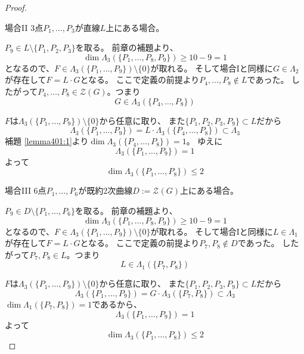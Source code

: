 \documentclass[a4paper]{jsarticle}
\begin{document}
\begin{proof}
            \begin{itembox}[l]{場合II}
                3点$P_1, \dots, P_3$が直線$L$上にある場合。
            \end{itembox}
            $P_9 \in L \setminus \{P_1, P_2, P_3\}$を取る。
            前章の補題より、
            \[ \dim \Lambda_3(\{P_1, \dots, P_8, P_9 \}) \geq 10-9=1 \]
            となるので、$F \in \Lambda_3(\{P_1, \dots, P_9 \}) \setminus \{0\}$が取れる。
            そして場合Iと同様に$G \in \Lambda_2$が存在して$F=L \cdot G$となる。
            ここで定義の前提より$P_4, \dots, P_8 \not \in L$であった。
            したがって$P_4, \dots, P_8 \in \mathcal{Z}(G)$。つまり
            \[ G \in \Lambda_3(\{P_4, \dots, P_8 \}) \]

            $F$は$\Lambda_3(\{P_1, \dots, P_9 \}) \setminus \{0\}$から任意に取り、
            また$\{P_1, P_2, P_3, P_9\} \subset L$だから
            \[ \Lambda_3(\{P_1, \dots, P_9 \})=L \cdot \Lambda_3(\{P_4, \dots, P_8 \}) \subset \Lambda_3 \]
            補題 \ref{lemma401:1}より$\dim \Lambda_3(\{P_4, \dots, P_8 \})=1$。
            ゆえに
            \[ \Lambda_3(\{P_1, \dots, P_9 \})=1 \]
            よって
            \[ \dim \Lambda_3(\{P_1, \dots, P_8 \}) \leq 2 \]

            \begin{itembox}[l]{場合III}
                6点$P_1, \dots, P_6$が既約2次曲線$D:=\mathcal{Z}(G)$上にある場合。
            \end{itembox}
            $P_9 \in D \setminus \{P_1, \dots, P_6\}$を取る。
            前章の補題より、
            \[ \dim \Lambda_3(\{P_1, \dots, P_8, P_9 \}) \geq 10-9=1 \]
            となるので、$F \in \Lambda_3(\{P_1, \dots, P_9 \}) \setminus \{0\}$が取れる。
            そして場合Iと同様に$L \in \Lambda_1$が存在して$F=L \cdot G$となる。
            ここで定義の前提より$P_7, P_8 \not \in D$であった。
            したがって$P_7, P_8 \in L$。つまり
            \[ L \in \Lambda_1(\{P_7, P_8 \}) \]

            $F$は$\Lambda_3(\{P_1, \dots, P_9 \}) \setminus \{0\}$から任意に取り、
            また$\{P_1, P_2, P_3, P_9\} \subset L$だから
            \[ \Lambda_3(\{P_1, \dots, P_9 \})=G \cdot \Lambda_3(\{P_7, P_8 \}) \subset \Lambda_3 \]
            $\dim \Lambda_1(\{P_7, P_8 \})=1$であるから、
            \[ \Lambda_3(\{P_1, \dots, P_9 \})=1 \]
            よって
            \[ \dim \Lambda_3(\{P_1, \dots, P_8 \}) \leq 2 \]
        \end{proof}
\end{document}
